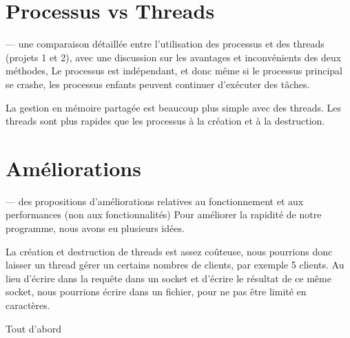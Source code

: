 \documentclass[utf8]{article}
\begin{document}
\section{Processus vs Threads}
— une comparaison détaillée entre l’utilisation des processus et des threads (projets 1 et 2),
avec une discussion sur les avantages et inconvénients des deux méthodes,
Le processus est indépendant, et donc même si le processus principal se crashe, les processus enfants peuvent continuer d'exécuter des tâches.

La gestion en mémoire partagée est beaucoup plus simple avec des threads.
Les threads sont plus rapides que les processus à la création et à la destruction.
\section{Améliorations}
— des propositions d’améliorations relatives au fonctionnement et aux performances (non
aux fonctionnalités)
Pour améliorer la rapidité de notre programme, nous avons eu plusieurs idées.

La création et destruction de threads est assez coûteuse, nous pourrions donc laisser un thread gérer un certains nombres de clients, par exemple 5 clients.
Au lieu d'écrire dans la requête dans un socket et d'écrire le résultat de ce même socket, nous pourrions écrire dans un fichier, pour ne pas être limité en caractères.

Tout d'abord
\end{document}
